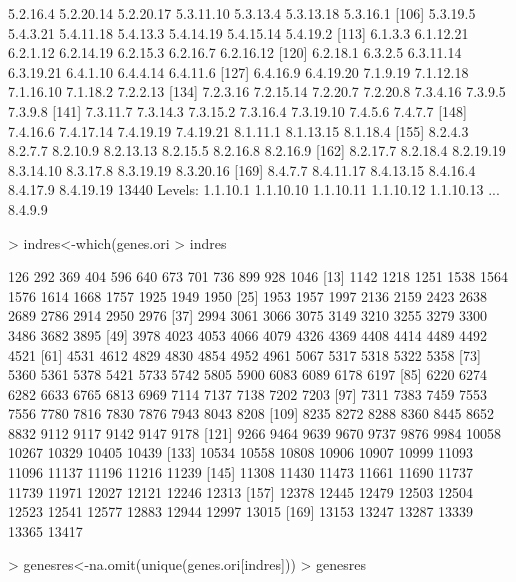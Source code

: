 \documentclass[12pt]{article}
\begin{document}
\begin{Schunk}
\begin{Soutput}
 [99] 5.2.16.4  5.2.20.14 5.2.20.17 5.3.11.10 5.3.13.4  5.3.13.18 5.3.16.1 
[106] 5.3.19.5  5.4.3.21  5.4.11.18 5.4.13.3  5.4.14.19 5.4.15.14 5.4.19.2 
[113] 6.1.3.3   6.1.12.21 6.2.1.12  6.2.14.19 6.2.15.3  6.2.16.7  6.2.16.12
[120] 6.2.18.1  6.3.2.5   6.3.11.14 6.3.19.21 6.4.1.10  6.4.4.14  6.4.11.6 
[127] 6.4.16.9  6.4.19.20 7.1.9.19  7.1.12.18 7.1.16.10 7.1.18.2  7.2.2.13 
[134] 7.2.3.16  7.2.15.14 7.2.20.7  7.2.20.8  7.3.4.16  7.3.9.5   7.3.9.8  
[141] 7.3.11.7  7.3.14.3  7.3.15.2  7.3.16.4  7.3.19.10 7.4.5.6   7.4.7.7  
[148] 7.4.16.6  7.4.17.14 7.4.19.19 7.4.19.21 8.1.11.1  8.1.13.15 8.1.18.4 
[155] 8.2.4.3   8.2.7.7   8.2.10.9  8.2.13.13 8.2.15.5  8.2.16.8  8.2.16.9 
[162] 8.2.17.7  8.2.18.4  8.2.19.19 8.3.14.10 8.3.17.8  8.3.19.19 8.3.20.16
[169] 8.4.7.7   8.4.11.17 8.4.13.15 8.4.16.4  8.4.17.9  8.4.19.19
13440 Levels: 1.1.10.1 1.1.10.10 1.1.10.11 1.1.10.12 1.1.10.13 ... 8.4.9.9
\end{Soutput}
\begin{Sinput}
> indres<-which(genes.ori%
> indres
\end{Sinput}
\begin{Soutput}
  [1]   126   292   369   404   596   640   673   701   736   899   928  1046
 [13]  1142  1218  1251  1538  1564  1576  1614  1668  1757  1925  1949  1950
 [25]  1953  1957  1997  2136  2159  2423  2638  2689  2786  2914  2950  2976
 [37]  2994  3061  3066  3075  3149  3210  3255  3279  3300  3486  3682  3895
 [49]  3978  4023  4053  4066  4079  4326  4369  4408  4414  4489  4492  4521
 [61]  4531  4612  4829  4830  4854  4952  4961  5067  5317  5318  5322  5358
 [73]  5360  5361  5378  5421  5733  5742  5805  5900  6083  6089  6178  6197
 [85]  6220  6274  6282  6633  6765  6813  6969  7114  7137  7138  7202  7203
 [97]  7311  7383  7459  7553  7556  7780  7816  7830  7876  7943  8043  8208
[109]  8235  8272  8288  8360  8445  8652  8832  9112  9117  9142  9147  9178
[121]  9266  9464  9639  9670  9737  9876  9984 10058 10267 10329 10405 10439
[133] 10534 10558 10808 10906 10907 10999 11093 11096 11137 11196 11216 11239
[145] 11308 11430 11473 11661 11690 11737 11739 11971 12027 12121 12246 12313
[157] 12378 12445 12479 12503 12504 12523 12541 12577 12883 12944 12997 13015
[169] 13153 13247 13287 13339 13365 13417
\end{Soutput}
\begin{Sinput}
> genesres<-na.omit(unique(genes.ori[indres]))
> genesres
\end{Sinput}
\begin{Soutput}

\end{Soutput}
\end{Schunk}
\end{document}
